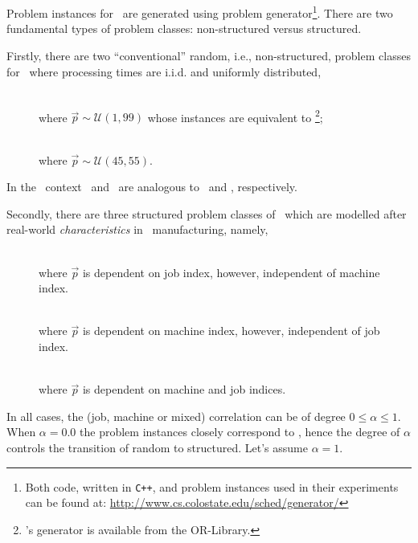 \section{\Fsp}\label{sec:data:FSP}
Problem instances for \FSP\  are generated using \citet{Whitley} problem 
generator\footnote{Both code, written in \texttt{C++}, and problem instances 
used in their experiments can be found at: 
\url{http://www.cs.colostate.edu/sched/generator/}}. There are two fundamental 
types of problem classes: non-structured versus structured.

Firstly, there are two ``conventional'' random, i.e., non-structured, problem classes for \FSP\  where processing times are i.i.d. and uniformly distributed, 
\begin{description}
	\item[\Frnd]   \hfill \\
	where $\vec{p}\sim\mathcal{U}(1,99)$ whose instances are equivalent to \cite{Taillard1993}\footnote{\citeauthor{Taillard1993}'s generator is available from the OR-Library.};
	\item[\Frndn]   \hfill \\
	where $\vec{p}\sim\mathcal{U}(45,55)$.
\end{description}
In the \JSP\ context \ and \ are analogous to \ and , respectively.  

Secondly, there are three structured problem classes of \FSP\  which are modelled after real-world \emph{characteristics} in \fsp\ manufacturing, namely, 
\begin{description}
	\item[\Fjc]  \hfill \\
	where $\vec{p}$ is dependent on job index, however, independent of 
	machine index. 
	\item[\Fmc]   \hfill \\
	where $\vec{p}$ is dependent on machine index, however, independent of 
	job index. 
	\item[\Fmxc]   \hfill \\
	where $\vec{p}$ is dependent on machine and job indices. 
\end{description} 
In all cases, the (job, machine or mixed) correlation can be of degree 
$0\leq\alpha\leq1$. 
When $\alpha=0.0$ the problem instances closely correspond to , 
hence the degree of $\alpha$ controls the transition of random to structured. 
Let's assume $\alpha=1$.

